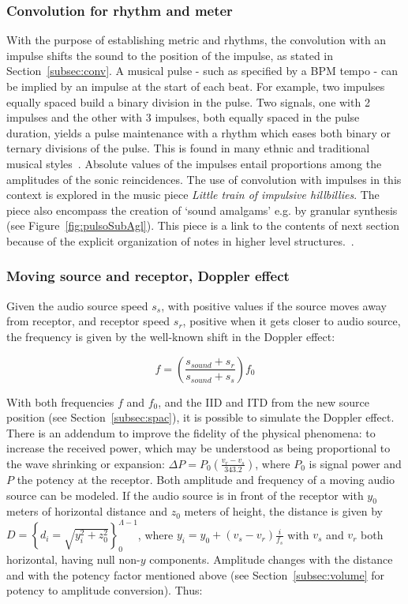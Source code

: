 \subsubsection{Convolution for rhythm and meter}
With the purpose of establishing metric and rhythms,
the convolution with an impulse shifts the sound to the position of the impulse, as stated in Section~\ref{subsec:conv}.
A musical pulse - such as specified by a BPM
tempo - can be implied by an impulse at the start of each beat.
For example, two impulses equally spaced build a binary division in the
pulse. Two signals, one with 2 impulses and the other with 3 impulses, both equally spaced in the pulse duration, yields a pulse
maintenance with a rhythm which eases both binary or ternary
divisions of the pulse. This is found in many ethnic and traditional musical styles~\cite{Gramani}. Absolute values of the impulses entail
proportions among the amplitudes of the sonic reincidences. The use of convolution with impulses in this context is explored in the music piece \emph{Little train of impulsive hillbillies}.
The piece also encompass
the creation of `sound amalgams' e.g. by granular synthesis (see Figure~\ref{fig:pulsoSubAgl}).
This piece is a link to the contents of next section because of the explicit organization of notes in higher level structures.~\cite{MASSA}.

\subsubsection{Moving source and receptor, Doppler effect}
Given the audio source speed $s_s$, with positive values if the source moves away from receptor,
and receptor speed $s_r$, positive when it gets closer to audio source, the frequency is given by the well-known shift in the Doppler effect:

\begin{equation}\label{eq:fDoppler}
    f=\left(\frac{s_{sound}+s_r}{s_{sound}+s_s}\right)f_0
\end{equation}

With both frequencies $f$ and $f_0$, and the IID and ITD from the new source
position (see Section~\ref{subsec:spac}), it is possible to simulate the Doppler effect. There is an addendum to improve the fidelity of the physical phenomena: to increase the received power, which may be understood as being proportional to the wave shrinking or expansion: $\Delta P=P_0\left(\frac{v_r-v_s}{343.2}\right)$,
 where $P_0$ is signal power and $P$ the potency at the receptor. Both amplitude and frequency of a moving audio source can be modeled. If the audio source is in front of the receptor with $y_0$ meters of horizontal distance and $z_0$ meters of height, the distance is given by
$D=\left\{ d_i=\sqrt{ y_{i}^{2}+z_{0}^{2} } \right\}_0^{\Lambda-1}$,
where $y_i=y_0+(v_s-v_r)\frac{i}{f_s}$ with $v_s$ and $v_r$ both
horizontal, having null non-$y$ components. Amplitude changes with the distance and with the potency factor mentioned above (see Section~\ref{subsec:volume} for potency to amplitude conversion). Thus:

